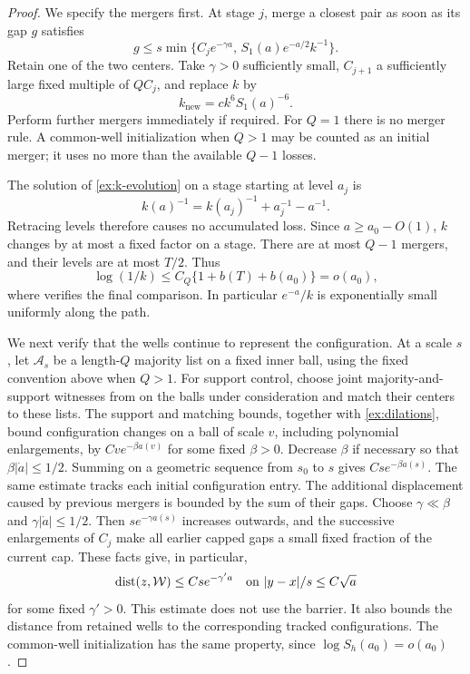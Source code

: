 \begin{proof}
We specify the mergers first. At stage \(j\), merge a closest pair
as soon as its gap \(g\) satisfies
\begin{equation}
 g\le s\min\{C_j e^{-\gamma a},\,
                   S_1(a)e^{-a/2}k^{-1}\}.
 \label{ex:merge-rule}
\end{equation}
Retain one of the two centers. Take \(\gamma>0\) sufficiently small,
\(C_{j+1}\) a sufficiently large fixed multiple of \(QC_j\), and
replace \(k\) by
\begin{equation}
 k_{\mathrm{new}}=c k^6S_1(a)^{-6}.
 \label{ex:merge-k}
\end{equation}
Perform further mergers immediately if required. For \(Q=1\)
there is no merger rule. A common-well initialization when \(Q>1\)
may be counted as an initial merger; it uses no more than the
available \(Q-1\) losses.

The solution of \eqref{ex:k-evolution} on a stage starting at
level \(a_j\) is
\[
 k(a)^{-1}=k(a_j)^{-1}+a_j^{-1}-a^{-1}.
\]
Retracing levels therefore causes no accumulated loss. Since
\(a\ge a_0-O(1)\), \(k\) changes by at most a fixed factor on a
stage. There are at most \(Q-1\) mergers, and their levels are at
most \(T/2\). Thus
\[
 \log(1/k)\le C_Q\{1+b(T)+b(a_0)\}=o(a_0),
\]
where  verifies the final comparison. In particular
\(e^{-a}/k\) is exponentially small uniformly along the path.

We next verify that the wells continue to represent the configuration.
At a scale \(s\), let \(\mathcal A_s\) be a length-\(Q\) majority list
on a fixed inner ball, using the fixed convention above when \(Q>1\).
For support control, choose joint majority-and-support witnesses from
 on the balls under consideration and match their
centers to these lists. The support and matching bounds, together with
\eqref{ex:dilations}, bound configuration changes on a ball of scale
\(v\), including polynomial enlargements, by
\(Cv e^{-\beta a(v)}\) for some fixed \(\beta>0\).
Decrease \(\beta\) if necessary so that
\(\beta|\dot a|\le1/2\). Summing on a geometric sequence from
\(s_0\) to \(s\) gives \(Cs e^{-\beta a(s)}\). The same estimate
tracks each initial configuration entry. The additional displacement
caused by previous mergers is bounded by the sum of their gaps.
Choose \(\gamma\ll\beta\) and \(\gamma|\dot a|\le1/2\). Then
\(s e^{-\gamma a(s)}\) increases outwards, and the successive
enlargements of \(C_j\) make all earlier capped gaps a small fixed
fraction of the current cap. These facts give, in particular,
\begin{equation}
 \operatorname{dist}(z,\mathcal W)\le Cs e^{-\gamma' a}
 \quad\text{on }|y-x|/s\le C\sqrt a
 \label{ex:rough-height}
\end{equation}
for some fixed \(\gamma'>0\). This estimate does not use the
barrier. It also bounds the distance from retained wells to the
corresponding tracked configurations. The common-well initialization
has the same property, since \(\log S_h(a_0)=o(a_0)\).


\end{proof}
